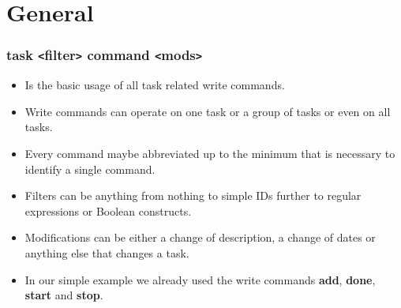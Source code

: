 \documentclass[t,handout]{beamer}
\begin{document}
\section{General}


\begin{frame}
\frametitle{task {\tt<}filter{\tt>} command {\tt<}mods{\tt>}}
\begin{itemize} 
\item Is the basic usage of all task related write commands.
\item Write commands can operate on one task or a group of tasks or even on all tasks.
\item Every command maybe abbreviated up to the minimum that is necessary to identify a single command.
\item Filters can be anything from nothing to simple IDs further to regular expressions or Boolean constructs.
\item Modifications can be either a change of description, a change of dates or anything else that changes a task.
\item In our simple example we already used the write commands \textbf{add}, \textbf{done}, \textbf{start} and \textbf{stop}.
\end{itemize}
\end{frame}
\end{document}
